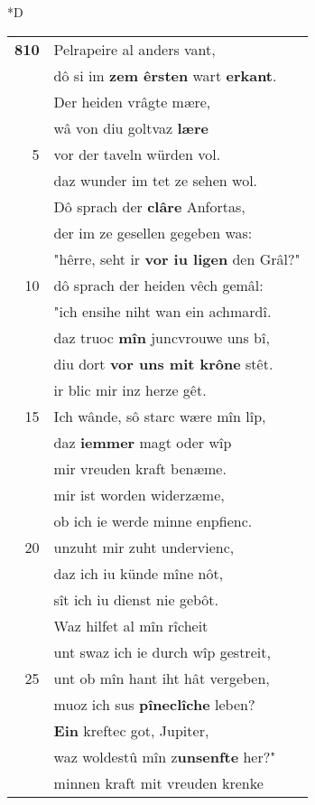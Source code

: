 \documentclass[8pt,a4paper,notitlepage]{article}
\begin{document}
\begin{table}[ht]
\begin{minipage}[t]{0.5\linewidth}
\small
\begin{center}*D
\end{center}
\begin{tabular}{rl}
\textbf{810} & Pelrapeire al anders vant,\\ 
 & dô si im \textbf{zem êrsten} wart \textbf{erkant}.\\ 
 & Der heiden vrâgte mære,\\ 
 & wâ von diu goltvaz \textbf{lære}\\ 
5 & vor der taveln würden vol.\\ 
 & daz wunder im tet ze sehen wol.\\ 
 & Dô sprach der \textbf{clâre} Anfortas,\\ 
 & der im ze gesellen gegeben was:\\ 
 & "hêrre, seht ir \textbf{vor iu ligen} den Grâl?"\\ 
10 & dô sprach der heiden vêch gemâl:\\ 
 & "ich ensihe niht wan ein achmardî.\\ 
 & daz truoc \textbf{mîn} juncvrouwe uns bî,\\ 
 & diu dort \textbf{vor uns mit krône} stêt.\\ 
 & ir blic mir inz herze gêt.\\ 
15 & Ich wânde, sô starc wære mîn lîp,\\ 
 & daz \textbf{iemmer} magt oder wîp\\ 
 & mir vreuden kraft benæme.\\ 
 & mir ist worden widerzæme,\\ 
 & ob ich ie werde minne enpfienc.\\ 
20 & unzuht mir zuht undervienc,\\ 
 & daz ich iu künde mîne nôt,\\ 
 & sît ich iu dienst nie gebôt.\\ 
 & Waz hilfet al mîn rîcheit\\ 
 & unt swaz ich ie durch wîp gestreit,\\ 
25 & unt ob mîn hant iht hât vergeben,\\ 
 & muoz ich sus \textbf{pîneclîche} leben?\\ 
 & \textbf{Ein} kreftec got, Jupiter,\\ 
 & waz woldestû mîn z\textbf{unsenfte} her?"\\ 
 & minnen kraft mit vreuden krenke\\ 

\end{tabular}
\end{minipage}
\end{table}
\end{document}
